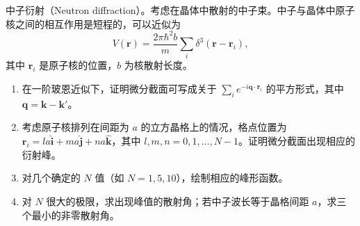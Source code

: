 \begin{question}
中子衍射（Neutron diffraction）。考虑在晶体中散射的中子束。中子与晶体中原子核之间的相互作用是短程的，可以近似为
\[
V(\mathbf r)=\frac{2\pi\hbar^2 b}{m}\sum_i\delta^3(\mathbf r-\mathbf r_i),
\]
其中 $\mathbf r_i$ 是原子核的位置，$b$ 为核散射长度。
\begin{enumerate}
\item 在一阶玻恩近似下，证明微分截面可写成关于 $\sum_i e^{-i\mathbf q\cdot\mathbf r_i}$ 的平方形式，其中 $\mathbf q=\mathbf k-\mathbf k'$。
\item 考虑原子核排列在间距为 $a$ 的立方晶格上的情况，格点位置为 $\mathbf r_i=l a\hat{\mathbf i}+m a\hat{\mathbf j}+n a\hat{\mathbf k}$，其中 $l,m,n=0,1,\ldots,N-1$。证明微分截面出现相应的衍射峰。
\item 对几个确定的 $N$ 值（如 $N=1,5,10$），绘制相应的峰形函数。
\item 对 $N$ 很大的极限，求出现峰值的散射角；若中子波长等于晶格间距 $a$，求三个最小的非零散射角。
\end{enumerate}
\end{question}
